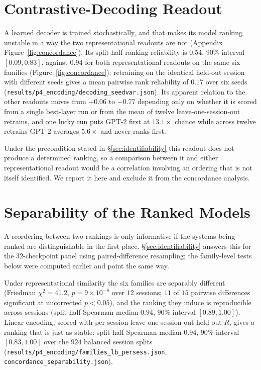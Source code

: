 \documentclass{article}
\begin{document}
\section{Contrastive-Decoding Readout}\label{app:decoding}

A learned decoder is trained stochastically, and that makes its model ranking unstable in a way the
two representational readouts are not (Appendix Figure~\ref{fig:concordance}). Its split-half
ranking reliability is $0.54$, $90\%$ interval $[0.09, 0.83]$, against $0.94$ for both representational
readouts on the same six families (Figure~\ref{fig:concordance}); retraining on
the identical held-out session with different seeds gives a mean pairwise rank reliability of $0.17$
over six seeds (\texttt{results/p4\_encoding/decoding\_seedvar.json}). Its apparent relation to the
other readouts moves from $+0.06$ to $-0.77$ depending only on whether it is scored from a single
best-layer run or from the mean of twelve leave-one-session-out retrains, and one lucky run puts
GPT-2 first at $13.1\times$ chance while across twelve retrains GPT-2 averages $5.6\times$ and never
ranks first.

Under the precondition stated in \S\ref{sec:identifiability} this readout does not produce a
determined ranking, so a comparison between it and either representational readout would be a
correlation involving an ordering that is not itself identified. We report it here and exclude it
from the concordance analysis.

\section{Separability of the Ranked Models}\label{app:separability}

A reordering between two rankings is only informative if the systems being ranked are
distinguishable in the first place. \S\ref{sec:identifiability} answers this for the $32$-checkpoint
panel using paired-difference resampling; the family-level tests below were computed earlier and
point the same way.

Under representational similarity the six families are separably different (Friedman
$\chi^2 = 41.2$, $p = 9 \times 10^{-8}$ over $12$ sessions; $11$ of $15$ pairwise differences
significant at uncorrected $p < 0.05$), and the ranking they induce is reproducible across sessions
(split-half Spearman median $0.94$, $90\%$ interval $[0.89, 1.00]$). Linear encoding, scored with
per-session leave-one-session-out held-out $R$, gives a ranking that is just as stable: split-half
Spearman median $0.94$, $90\%$ interval $[0.83, 1.00]$ over the $924$ balanced session splits
(\texttt{results/p4\_encoding/families\_lb\_persess.json},
\texttt{concordance\_separability.json}).
\end{document}
